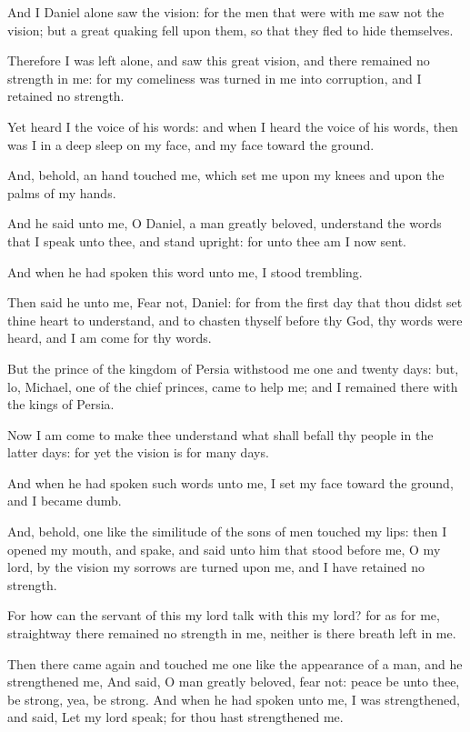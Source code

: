 \verse And I Daniel alone saw the vision: for the men that were with me saw not the vision; but a great quaking fell upon them, so that they fled to hide themselves.

\verse Therefore I was left alone, and saw this great vision, and there remained no strength in me: for my comeliness was turned in me into corruption, and I retained no strength.

\verse Yet heard I the voice of his words: and when I heard the voice of his words, then was I in a deep sleep on my face, and my face toward the ground.

\verse And, behold, an hand touched me, which set me upon my knees and upon the palms of my hands.

\verse And he said unto me, O Daniel, a man greatly beloved, understand the words that I speak unto thee, and stand upright: for unto thee am I now sent.

And when he had spoken this word unto me, I stood trembling.

\verse Then said he unto me, Fear not, Daniel: for from the first day that thou didst set thine heart to understand, and to chasten thyself before thy God, thy words were heard, and I am come for thy words.

\verse But the prince of the kingdom of Persia withstood me one and twenty days: but, lo, Michael, one of the chief princes, came to help me; and I remained there with the kings of Persia.

\verse Now I am come to make thee understand what shall befall thy people in the latter days: for yet the vision is for many days.

\verse And when he had spoken such words unto me, I set my face toward the ground, and I became dumb.

\verse And, behold, one like the similitude of the sons of men touched my lips: then I opened my mouth, and spake, and said unto him that stood before me, O my lord, by the vision my sorrows are turned upon me, and I have retained no strength.

\verse For how can the servant of this my lord talk with this my lord?  for as for me, straightway there remained no strength in me, neither is there breath left in me.

\verse Then there came again and touched me one like the appearance of a man, and he strengthened me, \verse And said, O man greatly beloved, fear not: peace be unto thee, be strong, yea, be strong. And when he had spoken unto me, I was strengthened, and said, Let my lord speak; for thou hast strengthened me.

